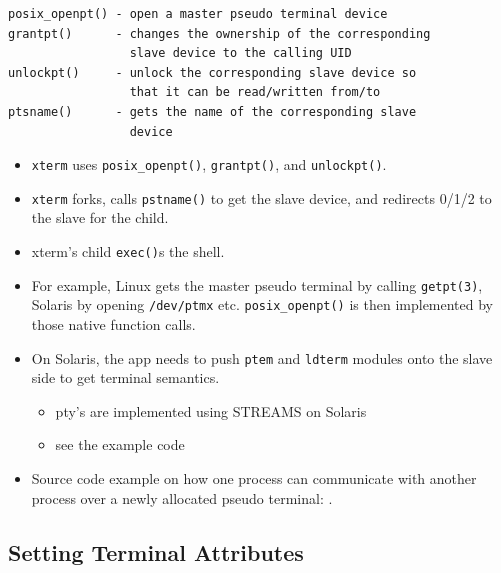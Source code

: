 \begin{verbatim}
posix_openpt() - open a master pseudo terminal device
grantpt()      - changes the ownership of the corresponding
                 slave device to the calling UID
unlockpt()     - unlock the corresponding slave device so
                 that it can be read/written from/to
ptsname()      - gets the name of the corresponding slave
                 device
\end{verbatim}


\begin{itemize}
\item \texttt{xterm} uses \texttt{posix\_openpt()}, \texttt{grantpt()}, and
\texttt{unlockpt()}.
\item \texttt{xterm} forks, calls \texttt{pstname()} to get the slave device,
and redirects 0/1/2 to the slave for the child.
\item xterm's child \texttt{exec()}s the shell.

\item For example, Linux gets the master pseudo terminal by calling
\texttt{getpt(3)}, Solaris by opening \texttt{/dev/ptmx} etc.
\texttt{posix\_openpt()} is then implemented by those native function calls.

\item On Solaris, the app needs to push \texttt{ptem} and \texttt{ldterm}
modules onto the slave side to get terminal semantics.
	\begin{itemize}
	\item pty's are implemented using STREAMS on Solaris
	\item see the example code
	\end{itemize}
\item Source code example on how one process can communicate with another
process over a newly allocated pseudo terminal: .
\end{itemize}

\subsection{Setting Terminal Attributes}

